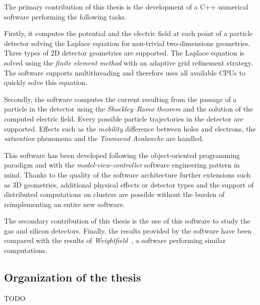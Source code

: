 \documentclass[11pt]{article}
\begin{document}
		The primary contribution of this thesis is the development of a C++ numerical software performing the
		following tasks.

		Firstly, it computes the potential and the electric field
		at each point of a particle detector solving the Laplace equation for non-trivial
		two-dimensions geometries. Three types of 2D detector geometries are supported.
		The Laplace equation is solved using the \textit{finite element method} with an adaptive
		grid refinement strategy. The software supports multithreading and therefore
		uses all available CPUs to quickly solve this equation.

		Secondly, the software computes the current resulting from the passage of a particle
		in the detector using the \textit{Shockley–Ramo theorem} and the solution of the
		computed electric field. Every possible particle trajectories in the detector
		are supported. Effects such as the \textit{mobility} difference between holes and
		electrons, the \textit{saturation} phenomena and the \textit{Townsend Avalanche}
		are handled.

		This software has been developed following the object-oriented
		programming paradigm and with the \textit{model-view-controller}
		software engineering pattern in mind. Thanks to the quality of the software
		architecture further extensions such as 3D geometries, additional physical effects or
		detector types and the support of distributed computations on clusters are possible
		without the burden of reimplementing an entire new software.

		The secondary contribution of this thesis is the use of this software to study
		the gas and silicon detectors. Finally, the results provided by the
		software have been compared with the results of \textit{Weightfield}~\cite{Cenna2015}, a
		software performing similar computations.


	\subsection*{Organization of the thesis}

		TODO

\end{document}
